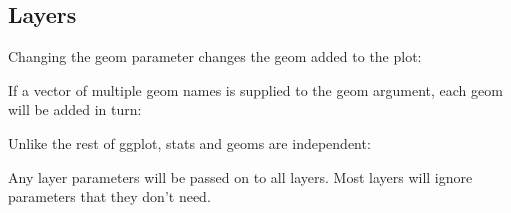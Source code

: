 \subsection{Layers}

Changing the geom parameter changes the geom added to the plot:

\begin{Shaded}
\begin{Highlighting}[]
  \NormalTok{)}
\StringTok{ }\NormalTok{()}
\end{Highlighting}
\end{Shaded}

If a vector of multiple geom names is supplied to the geom argument,
each geom will be added in turn:

\begin{Shaded}
\begin{Highlighting}[]
  \NormalTok{(}\NormalTok{, }\NormalTok{))}
\StringTok{ }\NormalTok{() +}\StringTok{ }\NormalTok{()}
\end{Highlighting}
\end{Shaded}

Unlike the rest of ggplot, stats and geoms are independent:

\begin{Shaded}
\begin{Highlighting}[]
  \NormalTok{)}
\StringTok{ }\NormalTok{(} \NormalTok{)  }
\end{Highlighting}
\end{Shaded}

Any layer parameters will be passed on to all layers. Most layers will
ignore parameters that they don't need.

\begin{Shaded}
\begin{Highlighting}[]
  \NormalTok{(}\NormalTok{, }\NormalTok{), }
   \NormalTok{)}
\StringTok{ }
\StringTok{  }\NormalTok{(} \NormalTok{) +}\StringTok{ }\NormalTok{(} \NormalTok{)}
\end{Highlighting}
\end{Shaded}

